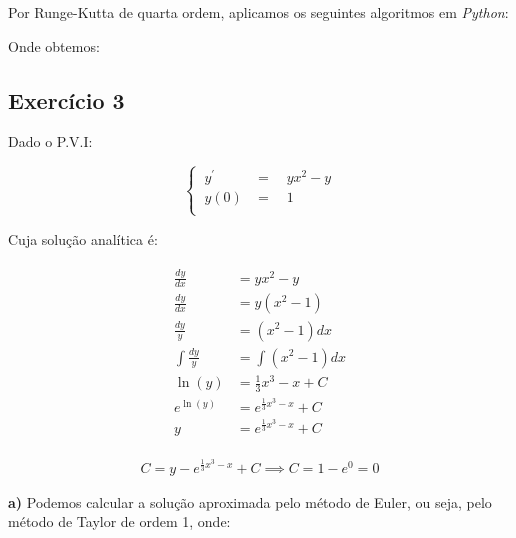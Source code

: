 \documentclass[paper=a4, fontsize=12pt]{scrartcl}
\numberwithin{equation}{section} %
\numberwithin{figure}{section} %
\numberwithin{table}{section} %
\newcommand{\euler}{e}
\begin{document}
		Por Runge-Kutta de quarta ordem, aplicamos os seguintes algoritmos em \textit{Python}:

		\hspace{2cm}

		

		

		Onde obtemos:




		\subsection{Exercício 3}

		Dado o P.V.I:

		\[
		\begin{cases}
		\ y^{'} &= \quad yx^2 - y\\

		\ y(0) &= \quad 1\\
		\end{cases}
		\]

		Cuja solução analítica é:

		\begin{align*}
			\begin{split}
				\frac{dy}{dx} &= yx^2 - y \\
				\frac{dy}{dx} &= y(x^2 - 1) \\
				\frac{dy}{y} &= (x^2 - 1)dx \\
				\int \frac{dy}{y} &= \int (x^2 - 1)dx \\
				\ln(y) &= \frac{1}{3}x^3 - x + C \\
				\euler^{\ln(y)} &= \euler^{\frac{1}{3}x^3 - x }+ C \\
				y &= \euler^{\frac{1}{3}x^3 - x } + C
			\end{split}
		\end{align*}

		\begin{align*}
			C = y - \euler^{\frac{1}{3}x^3 - x }+ C  \implies C = 1 - \euler^{0} = 0
		\end{align*}

		\textbf{a)} Podemos calcular a solução aproximada pelo método de Euler, ou seja, pelo método de Taylor de ordem 1, onde:
\end{document}
